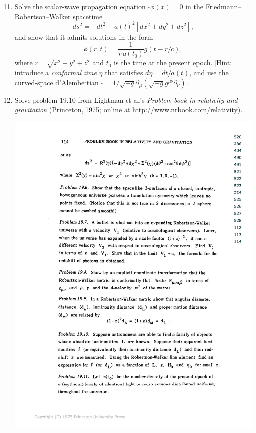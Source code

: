 \documentclass[article, onecolumn, ,nofootinbib,nopreprintnumbers]{revtex4}
\begin{document}
\begin{enumerate}
\setcounter{enumi}{10}

\item Solve the scalar-wave propagation equation $\square \phi(x) = 0$ in the Friedmann--Robertson--Walker spacetime
%
\begin{equation}
ds^2 = -dt^2 + a(t)^2 [dx^2 + dy^2 + dz^2],
\end{equation}
%
and show that it admits solutions in the form
%
\begin{equation}
\phi(r,t) = \frac{1}{r \, a(t_0)} g(t - r/c),
\end{equation}
%
where $r = \sqrt{x^2 + y^2 + z^2}$ and $t_0$ is the time at the present epoch. [Hint: introduce a \emph{conformal time} $\eta$ that satisfies $d \eta = dt / a(t)$, and use the curved-space d'Alembertian $\square = 1/\sqrt{-g} \partial_\mu (\sqrt{-g} g^{\mu \nu} \partial_\nu)$].

\item Solve problem 19.10 from Lightman et al.'s \textit{Problem book in relativity and gravitation} (Princeton, 1975; online at \url{http://www.nrbook.com/relativity}). 

\begin{center}
\includegraphics[width=5in]{problem-19-10.pdf}
\end{center}

\end{enumerate}


\end{document}
